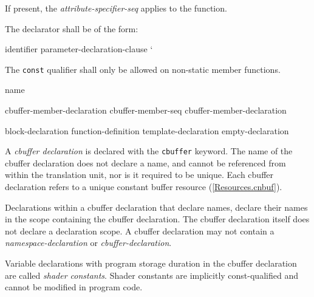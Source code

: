 \p If present, the \textit{attribute-specifier-seq} applies to the function.

\p The declarator shall be of the form:

\begin{innergrammar}
  identifier \terminal{(} parameter-declaration-clause \terminal{)} ` 
\end{innergrammar}

\p The \texttt{const} qualifier shall only be allowed on non-static member
functions.


\begin{grammar}
  \br
   name  \terminal{\{}
     \terminal {\}}\br

  \br
  cbuffer-member-declaration\br
  cbuffer-member-seq cbuffer-member-declaration\br

  \br
  block-declaration\br
  function-definition\br
  template-declaration\br
  empty-declaration
\end{grammar}

\p A \textit{cbuffer declaration} is declared with the \texttt{cbuffer} keyword.
The name of the cbuffer declaration does not declare a name, and cannot be
referenced from within the translation unit, nor is it required to be unique.
Each cbuffer declaration refers to a unique constant buffer resource
(\ref{Resources.cnbuf}).

\p Declarations within a cbuffer declaration that declare names, declare their
names in the scope containing the cbuffer declaration. The cbuffer declaration
itself does not declare a declaration scope. A cbuffer declaration may not
contain a \textit{namespace-declaration} or \textit{cbuffer-declaration}.

\p Variable declarations with program storage duration in the cbuffer
declaration are called \textit{shader constants}. Shader constants are implicitly
const-qualified and cannot be modified in program code.


